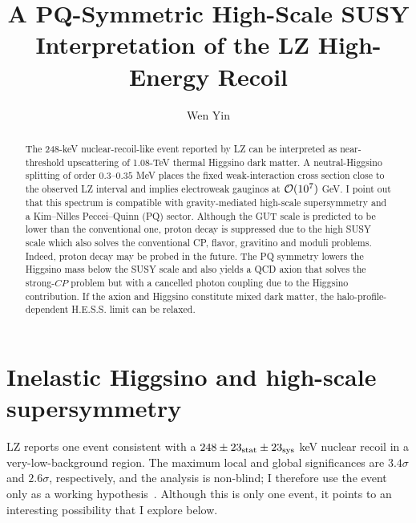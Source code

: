 \documentclass[superscriptaddress,aps,preprintnumbers,amsmath,amssymb,prd,nofootinbib,reprint]{revtex4-1}
\def\WY#1{#1}
\begin{document}
\title{\WY{A PQ-Symmetric High-Scale SUSY Interpretation of the LZ High-Energy Recoil}}

\author{Wen Yin}

\begin{abstract}
The 248-keV nuclear-recoil-like event reported by LZ can be interpreted as near-threshold upscattering of 1.08-TeV thermal Higgsino dark
matter.  A neutral-Higgsino splitting of order $0.3$--$0.35$ MeV places the
fixed weak-interaction cross section close to the observed LZ interval and
implies electroweak gauginos at ${\cal O}(10^7)$ GeV.  I point out that this spectrum is
compatible with gravity-mediated high-scale supersymmetry and a Kim--Nilles
Peccei--Quinn (PQ) sector.  
Although the GUT scale is predicted to be lower than the conventional one, proton decay is suppressed due to the high SUSY  scale which also solves the conventional CP, flavor, gravitino and moduli problems. Indeed, proton decay may be probed in the future. 
The PQ symmetry lowers the Higgsino mass below the SUSY scale and
also yields a QCD axion that solves the strong-$CP$ problem but with a cancelled photon coupling due to the Higgsino contribution. If the axion and Higgsino
constitute mixed dark matter, the halo-profile-dependent H.E.S.S. limit can be  relaxed. 
\end{abstract}

\maketitle

\section{Inelastic Higgsino and high-scale supersymmetry}

LZ reports one event consistent with a
$248\pm23_{\rm stat}\pm23_{\rm sys}$ keV nuclear recoil \WY{in a
very-low-background region}.  The maximum local and global significances are $3.4\sigma$
and $2.6\sigma$, respectively, and \WY{the analysis is non-blind; I therefore
use the event only as a working hypothesis}~\cite{LZ:2026highE}.
\WY{Although this is only one event, it points to an interesting possibility
that I explore below.}
\end{document}
